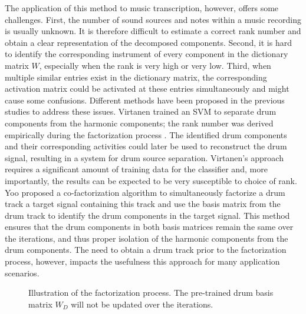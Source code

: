 \documentclass{article}
\begin{document}
The application of this method to music transcription, however, offers some challenges. 
First, the number of sound sources and notes within a music recording is usually unknown. It is therefore difficult to estimate a correct rank number and obtain a clear representation of the decomposed  components. 
Second, it is hard to identify the corresponding instrument of every component in the dictionary matrix $W$, especially when the rank is very high or very low. 
Third, when multiple similar entries exist in the dictionary matrix, the corresponding activation matrix could be activated at these entries simultaneously and might cause some confusions. %
Different methods have been proposed in the previous studies to address these issues. Virtanen trained an SVM to separate drum components from the harmonic components; the rank number was derived empirically during the factorization process \cite{helen_separation_2005}. The identified drum components and their corresponding activities could later be used to reconstruct the drum signal, resulting in a system for drum source separation. Virtanen's approach requires a significant amount of training data for the classifier and, more importantly, the results can be expected to be very susceptible to choice of rank. %
Yoo proposed a co-factorization algorithm \cite{yoo_nonnegative_2010} to simultaneously factorize a drum track a target signal containing this track and use the basis matrix from the drum track to identify the drum components in the target signal. This method ensures that the drum components in both basis matrices remain the same over the iterations, and thus proper isolation of the harmonic components from the drum components. The need to obtain a drum track prior to the factorization process, however, impacts the usefulness this approach for many application scenarios.

\begin{figure}
 \centerline{}
 \caption{Illustration of the factorization process. The pre-trained drum basis matrix $W_D$ will not be updated over the iterations.} %
 \label{fig:factorization}
\end{figure}
\end{document}
